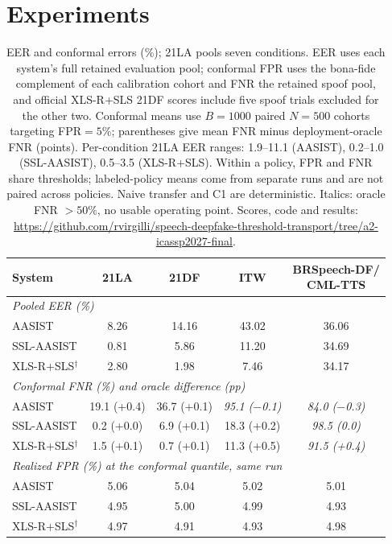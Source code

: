 \documentclass{article}
\begin{document}
\section{Experiments}
\begin{table}[!tp]
\caption{EER and conformal errors (\%); 21LA pools seven conditions. EER uses each system's full retained evaluation pool; conformal FPR uses the bona-fide complement of each calibration cohort and FNR the retained spoof pool, and official XLS-R+SLS 21DF scores include five spoof trials excluded for the other two. Conformal means use $B{=}1000$ paired $N{=}500$ cohorts targeting FPR${=}5\%$; parentheses give mean FNR minus deployment-oracle FNR (points). Per-condition 21LA EER ranges: 1.9--11.1 (AASIST), 0.2--1.0 (SSL-AASIST), 0.5--3.5 (XLS-R+SLS). Within a policy, FPR and FNR share thresholds; labeled-policy means come from separate runs and are not paired across policies. Naive transfer and C1 are deterministic. Italics: oracle FNR ${>}50\%$, no usable operating point. Scores, code and results: \protect\url{https://github.com/rvirgilli/speech-deepfake-threshold-transport/tree/a2-icassp2027-final}.}
\label{tab:fnr}
\centering\small\setlength{\tabcolsep}{0.8pt}
\begin{tabular}{lcccc}
\toprule
System & 21LA & 21DF & ITW & \shortstack{BRSpeech-DF/\\CML-TTS} \\
\midrule
\multicolumn{5}{l}{\emph{Pooled EER (\%)}} \\
AASIST & 8.26 & 14.16 & 43.02 & 36.06 \\
SSL-AASIST & 0.81 & 5.86 & 11.20 & 34.69 \\
XLS-R+SLS$^\dagger$ & 2.80 & 1.98 & 7.46 & 34.17 \\
\midrule
\multicolumn{5}{l}{\emph{Conformal FNR (\%) and oracle difference (pp)}} \\
AASIST & 19.1 (+0.4) & 36.7 (+0.1) & \emph{95.1 ($-$0.1)} & \emph{84.0 ($-$0.3)} \\
SSL-AASIST & 0.2 (+0.0) & 6.9 (+0.1) & 18.3 (+0.2) & \emph{98.5 (0.0)} \\
XLS-R+SLS$^\dagger$ & 1.5 (+0.1) & 0.7 (+0.1) & 11.3 (+0.5) & \emph{91.5 (+0.4)} \\
\midrule
\multicolumn{5}{l}{\emph{Realized FPR (\%) at the conformal quantile, same run}} \\
AASIST & 5.06 & 5.04 & 5.02 & 5.01 \\
SSL-AASIST & 4.95 & 5.00 & 4.99 & 4.93 \\
XLS-R+SLS$^\dagger$ & 4.97 & 4.91 & 4.93 & 4.98 \\

\end{tabular}
\end{table}
\end{document}
